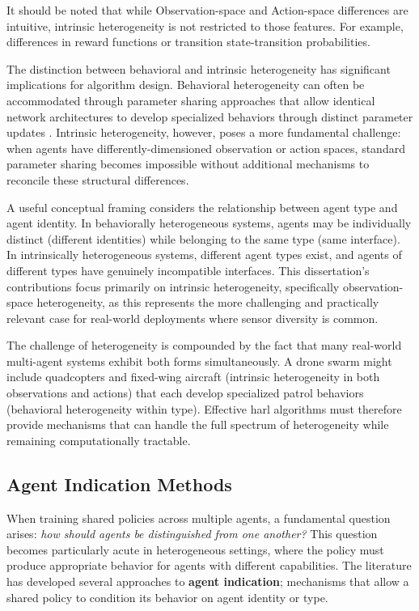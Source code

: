 It should be noted that while Observation-space and 
Action-space differences are intuitive, intrinsic heterogeneity 
is not restricted to those features. For example, differences
in reward functions or transition state-transition probabilities.

The distinction between behavioral and intrinsic heterogeneity has significant 
implications for algorithm design. Behavioral heterogeneity can often be 
accommodated through parameter sharing approaches that allow identical 
network architectures to develop specialized behaviors through distinct 
parameter updates \cite{christianos2021}. Intrinsic heterogeneity, however, 
poses a more fundamental challenge: when agents have differently-dimensioned 
observation or action spaces, standard parameter sharing becomes impossible 
without additional mechanisms to reconcile these structural differences.

A useful conceptual framing considers the relationship between agent type 
and agent identity. In behaviorally heterogeneous systems, agents may be 
individually distinct (different identities) while belonging to the 
same type (same interface). In intrinsically heterogeneous systems, 
different agent types exist, and agents of different types have genuinely 
incompatible interfaces. This dissertation's contributions focus primarily 
on intrinsic heterogeneity, specifically observation-space heterogeneity, 
as this represents the more challenging and practically relevant case for 
real-world deployments where sensor diversity is common.


The challenge of heterogeneity is compounded by the fact that many 
real-world multi-agent systems exhibit both forms simultaneously. 
A drone swarm might include quadcopters and fixed-wing aircraft 
(intrinsic heterogeneity in both observations and actions) that each 
develop specialized patrol behaviors (behavioral heterogeneity within type). 
Effective \gls{harl} algorithms must therefore provide mechanisms that can 
handle the full spectrum of heterogeneity while remaining computationally tractable.

\subsection{Agent Indication Methods}
\label{subsec:agent-indication}

When training shared policies across multiple agents, a fundamental 
question arises: \emph{how should agents be distinguished from one another?} 
This question becomes particularly acute in heterogeneous settings, 
where the policy must produce appropriate behavior for agents with 
different capabilities. The literature has developed 
several approaches to \textbf{agent indication}; mechanisms that allow 
a shared policy to condition its behavior on agent identity or type.

